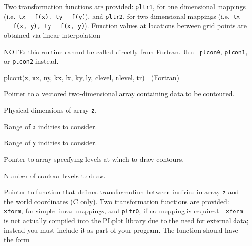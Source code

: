 Two transformation functions are provided:  {\tt pltr1}, for one dimensional
mappings (i.e.~{\tt tx$=$f(x), ty$=$f(y)}), and {\tt pltr2}, for two
dimensional mappings (i.e.~{\tt tx$=$f(x, y), ty$=$f(x, y)}).  Function values
at locations between grid points are obtained via linear interpolation.  

NOTE:  this routine cannot be called directly from Fortran.  Use {\tt
plcon0}, {\tt plcon1}, or {\tt plcon2} instead.


	{plcont(z, nx, ny, kx, lx, ky, ly, clevel, nlevel, tr)}{\ \ (Fortran)}
\label{plcont}


 {Pointer to a vectored two-dimensional array
containing data to be contoured.}

 {Physical dimensions of array {\tt z}.}

 {Range of {\tt x} indicies to consider.}

 {Range of {\tt y} indicies to consider.}

 {Pointer to array specifying
    levels at which to draw contours.}

 {Number of contour levels to draw.}

 {Pointer to function that defines
transformation between indicies in array {\tt z} and the world coordinates
(C only).  Two transformation functions are provided:  {\tt xform}, for
simple linear mappings, and {\tt pltr0}, if no mapping is required.  {\tt
xform} is not actually compiled into the PLplot library due to the need for
external data; instead you must include it as part of your program.  The
function should have the form

  }

